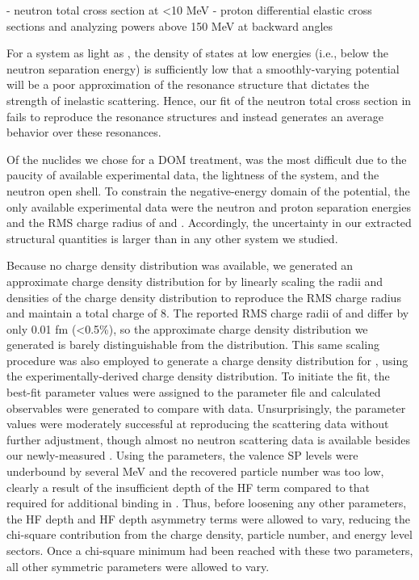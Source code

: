 - neutron total cross section at <10 MeV
- proton differential elastic cross sections and analyzing powers above 150 MeV at backward angles

For a system as light as \oSix, the density of states at low energies (i.e., below the neutron
separation energy) is sufficiently low that a smoothly-varying potential will be a poor
approximation of the resonance structure that dictates the strength of inelastic scattering. Hence,
our fit of the neutron total cross section in \oSix fails to reproduce the resonance structures and
instead generates an average behavior over these resonances.

Of the nuclides we chose for a DOM treatment, \oEight was the most difficult due to the paucity of
available experimental data, the lightness of the system, and the neutron open shell. To constrain the negative-energy domain
of the potential, the only available experimental data were the neutron and proton separation
energies and the RMS charge radius of \oEight and \neEight. Accordingly, the uncertainty in our extracted structural quantities is
larger than in any other system we studied.

Because no \oEight charge density distribution was available, we generated an approximate charge density
distribution for \oEight by linearly scaling
the radii and densities of the \oSix charge density distribution to reproduce the \oEight RMS charge
radius and maintain a total charge of 8. The reported RMS charge radii of \oSix and \oEight differ by only
0.01 fm (<0.5\%), so the approximate \oEight charge density distribution we generated is barely
distinguishable from the \oSix distribution. This same scaling procedure was also employed to
generate a charge density distribution for \snTwelve, using the
experimentally-derived \snFour charge density distribution. To initiate the fit, the \oSix best-fit parameter values
were assigned to the \oEight parameter file and calculated observables were generated to compare
with \oEight data. Unsurprisingly, the \oSix parameter values were moderately successful at reproducing
the \oEight scattering data without further adjustment, though almost no neutron scattering data is
available besides our newly-measured \tot. Using the \oSix parameters, the \oEight valence SP levels were underbound
by several MeV and the recovered particle number was too low, clearly a result of the insufficient
depth of the \oSix HF term compared to that required for additional binding in \oEight. Thus, before
loosening any other parameters, the HF depth and HF depth asymmetry terms were allowed to vary,
reducing the chi-square contribution from the charge density, particle number, and energy level
sectors. Once a chi-square minimum had been reached with these two parameters, all other symmetric parameters
were allowed to vary.

